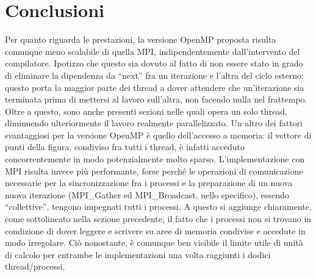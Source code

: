 \documentclass[a4paper, 12pt]{article}
\begin{document}
    \section*{Conclusioni}
    Per quanto riguarda le prestazioni, la versione OpenMP proposta risulta comunque meno scalabile di quella MPI, indipendentemente dall'intervento del compilatore.
    \newline Ipotizzo che questo sia dovuto al fatto di non essere stato in grado di eliminare la dipendenza da “next” fra un iterazione e l’altra del ciclo esterno: questo porta la 
    maggior parte dei thread a dover attendere che un’iterazione sia terminata prima di mettersi al lavoro sull’altra, non facendo nulla nel frattempo.
    Oltre a questo, sono anche presenti sezioni nelle quali opera un solo thread, diminuendo ulteriormente il lavoro realmente parallelizzato.
    \newline Un altro dei fattori svantaggiosi per la versione OpenMP è quello dell'accesso a memoria: il vettore di punti della figura, condiviso fra tutti i thread, è infatti acceduto concorrentemente in modo
    potenzialmente molto sparso.
    \newline L’implementazione con MPI risulta invece più performante, forse perché le operazioni di comunicazione necessarie per la sincronizzazione fra i processi e la 
    preparazione di un nuova nuova iterazione (MPI_Gather ed MPI_Broadcast, nello specifico), essendo “collettive”, tengono impegnati tutti i processi.
    A questo si aggiunge chiaramente, come sottolineato nella sezione precedente, il fatto che i processi non si trovano in condizione di dover leggere e scrivere su aree di memoria condivise e accedute in modo irregolare.
    \newline Ciò nonostante, è comunque ben visibile il limite utile di unità di calcolo per entrambe le implementazioni una volta raggiunti i dodici thread/processi.
\end{document}
